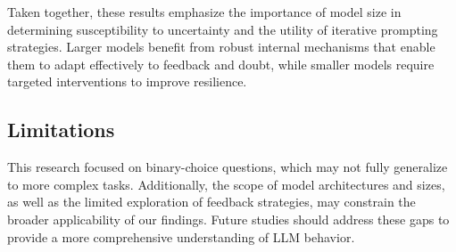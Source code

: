Taken together, these results emphasize the importance of model size in determining susceptibility to uncertainty and the utility of iterative prompting strategies. Larger models benefit from robust internal mechanisms that enable them to adapt effectively to feedback and doubt, while smaller models require targeted interventions to improve resilience.

\subsection{Limitations}
This research focused on binary-choice questions, which may not fully generalize to more complex tasks. Additionally, the scope of model architectures and sizes, as well as the limited exploration of feedback strategies, may constrain the broader applicability of our findings. Future studies should address these gaps to provide a more comprehensive understanding of LLM behavior.